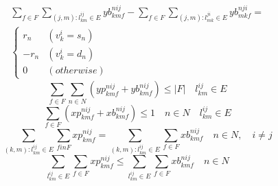 \documentclass[a4j,twocolumn,fleqn]{jarticle}
\begin{document}
\begin{eqnarray}%
\sum_{f \in F}\sum_{(j,m):l^{ij}_{km}\in E}yb^{nij}_{kmf} - \sum_{f \in F}\sum_{(j,m):l^{ji}_{mk}\in E}yb^{nji}_{mkf}= \nonumber \\
\begin{cases}
r_n & (v^i_k = s_n)\\
-r_n & (v^i_k =d_n)\\
0 & (otherwise)
\end{cases}
\end{eqnarray}%
\begin{equation}
\sum_{f \in F} \sum_{n \in N}(yp^{nij}_{kmf}+yb^{nij}_{kmf}) \leq |F| \quad  l^{ij}_{km} \in E
\end{equation}
\begin{equation}
\sum_{f \in F}(xp^{nij}_{kmf} + xb^{nij}_{kmf}) \leq 1 \quad n \in N \quad l^{ij}_{km} \in E
\end{equation}
\begin{equation}
\sum_{(k,m):l^{ij}_{km} \in E}\sum_{f in F}xp^{nij}_{kmf} = \sum_{(k,m):l^{ij}_{km}\in E}\sum_{f \in F}xb^{nij}_{kmf}\quad n \in N,\quad i \neq j
\end{equation}
\begin{equation}
\sum_{l^{ij}_{km}\in E}\sum_{f \in F}xp^{nij}_{kmf} \leq \sum_{l^{ij}_{km}\in E}\sum_{f \in F}xb^{nij}_{kmf}\quad n \in N
\end{equation}

\newpage
\end{document}
